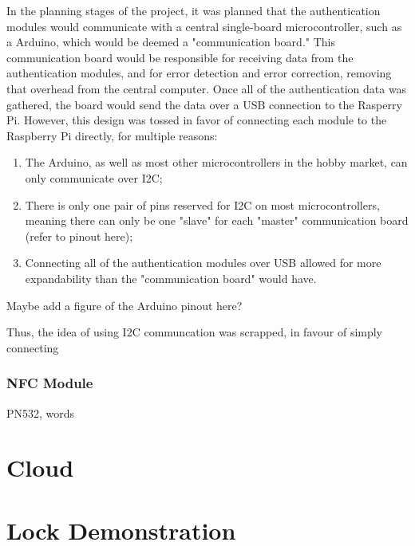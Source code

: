 \documentclass[12pt]{report}
\begin{document}
In the planning stages of the project, it was planned that the authentication modules would communicate with a central 
single-board microcontroller, such as a Arduino, which would be deemed a "communication board." This communication board
would be responsible for receiving data from the authentication modules, and for error detection and error correction, 
removing that overhead from the central computer. Once all of the authentication data was gathered, the board would send 
the data over a USB connection to the Rasperry Pi. However, this design was tossed in favor of connecting each module to  
the Raspberry Pi directly, for multiple reasons:
\begin{enumerate}
    \item The Arduino, as well as most other microcontrollers in the hobby market, can only communicate over I2C;
    \item There is only one pair of pins reserved for I2C on most microcontrollers, meaning there can only be one 
    "slave" for each "master" communication board (refer to pinout here);
    \item Connecting all of the authentication modules over USB allowed for more expandability than the "communication
    board" would have.
\end{enumerate}

Maybe add a figure of the Arduino pinout here?

Thus, the idea of using I2C communcation was scrapped, in favour of simply connecting 

\subsubsection{NFC Module}

PN532, words


\section{Cloud}


\section{Lock Demonstration}
\end{document}
